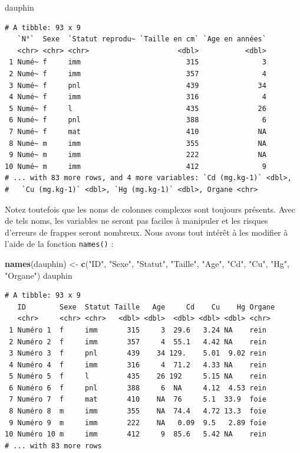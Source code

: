 \documentclass[a4paperpaper,]{article}
\newenvironment{Shaded}{\begin{snugshade}}{\end{snugshade}}
\newcommand{\KeywordTok}[1]{\textcolor[rgb]{0.12,0.11,0.11}{\textbf{#1}}}
\newcommand{\NormalTok}[1]{\textcolor[rgb]{0.12,0.11,0.11}{#1}}
\newcommand{\StringTok}[1]{\textcolor[rgb]{0.75,0.01,0.01}{#1}}
\begin{document}
\begin{Shaded}
\begin{Highlighting}[]
\NormalTok{dauphin}
\end{Highlighting}
\end{Shaded}

\begin{verbatim}
# A tibble: 93 x 9
   `N°`  Sexe  `Statut reprodu~ `Taille en cm` `Age en années`
   <chr> <chr> <chr>                     <dbl>           <dbl>
 1 Numé~ f     imm                         315               3
 2 Numé~ f     imm                         357               4
 3 Numé~ f     pnl                         439              34
 4 Numé~ f     imm                         316               4
 5 Numé~ f     l                           435              26
 6 Numé~ f     pnl                         388               6
 7 Numé~ f     mat                         410              NA
 8 Numé~ m     imm                         355              NA
 9 Numé~ m     imm                         222              NA
10 Numé~ m     imm                         412               9
# ... with 83 more rows, and 4 more variables: `Cd (mg.kg-1)` <dbl>,
#   `Cu (mg.kg-1)` <dbl>, `Hg (mg.kg-1)` <dbl>, Organe <chr>
\end{verbatim}

Notez toutefois que les noms de colonnes complexes sont toujours présents. Avec de tels noms, les variables ne seront pas faciles à manipuler et les risques d'erreurs de frappes seront nombreux. Nous avons tout intérêt à les modifier à l'aide de la fonction \texttt{names()} :

\begin{Shaded}
\begin{Highlighting}[]
\KeywordTok{names}\NormalTok{(dauphin) <-}\StringTok{ }\KeywordTok{c}\NormalTok{(}\StringTok{"ID"}\NormalTok{, }\StringTok{"Sexe"}\NormalTok{, }\StringTok{"Statut"}\NormalTok{, }\StringTok{"Taille"}\NormalTok{, }\StringTok{"Age"}\NormalTok{, }\StringTok{"Cd"}\NormalTok{, }\StringTok{"Cu"}\NormalTok{, }
    \StringTok{"Hg"}\NormalTok{, }\StringTok{"Organe"}\NormalTok{)}
\NormalTok{dauphin}
\end{Highlighting}
\end{Shaded}

\begin{verbatim}
# A tibble: 93 x 9
   ID        Sexe  Statut Taille   Age     Cd    Cu    Hg Organe
   <chr>     <chr> <chr>   <dbl> <dbl>  <dbl> <dbl> <dbl> <chr> 
 1 Numéro 1  f     imm       315     3  29.6   3.24 NA    rein  
 2 Numéro 2  f     imm       357     4  55.1   4.42 NA    rein  
 3 Numéro 3  f     pnl       439    34 129.    5.01  9.02 rein  
 4 Numéro 4  f     imm       316     4  71.2   4.33 NA    rein  
 5 Numéro 5  f     l         435    26 192     5.15 NA    rein  
 6 Numéro 6  f     pnl       388     6  NA     4.12  4.53 rein  
 7 Numéro 7  f     mat       410    NA  76     5.1  33.9  foie  
 8 Numéro 8  m     imm       355    NA  74.4   4.72 13.3  foie  
 9 Numéro 9  m     imm       222    NA   0.09  9.5   2.89 foie  
10 Numéro 10 m     imm       412     9  85.6   5.42 NA    rein  
# ... with 83 more rows
\end{verbatim}
\end{document}
